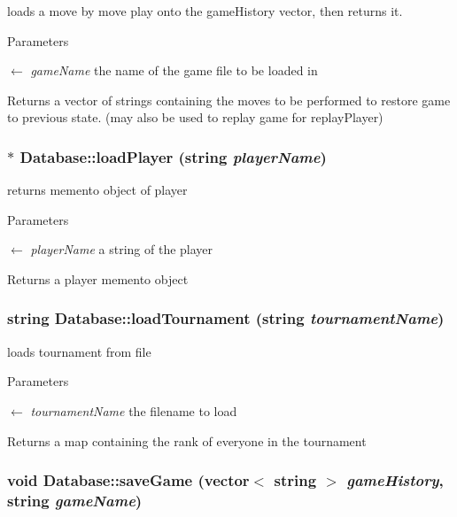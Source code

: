 loads a move by move play onto the gameHistory vector, then returns it. 
\begin{DoxyParams}{Parameters}
\item[\mbox{$\leftarrow$} {\em gameName}]the name of the game file to be loaded in \end{DoxyParams}
\begin{DoxyReturn}{Returns}
a vector of strings containing the moves to be performed to restore game to previous state. (may also be used to replay game for replayPlayer) 
\end{DoxyReturn}
\hypertarget{classDatabase_a635262537d097df45f6371966d9caefe}{
\subsubsection[{loadPlayer}]{$\ast$ Database::loadPlayer (string {\em playerName})}}
\label{classDatabase_a635262537d097df45f6371966d9caefe}


returns memento object of player 
\begin{DoxyParams}{Parameters}
\item[\mbox{$\leftarrow$} {\em playerName}]a string of the player \end{DoxyParams}
\begin{DoxyReturn}{Returns}
a player memento object 
\end{DoxyReturn}
\hypertarget{classDatabase_a1b403d4b38ea6c9d2e5d4d4b80f845db}{
\subsubsection[{loadTournament}]{\setlength{\rightskip}{0pt plus 5cm}string Database::loadTournament (string {\em tournamentName})}}
\label{classDatabase_a1b403d4b38ea6c9d2e5d4d4b80f845db}


loads tournament from file 
\begin{DoxyParams}{Parameters}
\item[\mbox{$\leftarrow$} {\em tournamentName}]the filename to load \end{DoxyParams}
\begin{DoxyReturn}{Returns}
a map containing the rank of everyone in the tournament 
\end{DoxyReturn}
\hypertarget{classDatabase_ab7769733153f13a11257401ed7b2bf23}{
\subsubsection[{saveGame}]{\setlength{\rightskip}{0pt plus 5cm}void Database::saveGame (vector$<$ string $>$ {\em gameHistory}, \/  string {\em gameName})}}
\label{classDatabase_ab7769733153f13a11257401ed7b2bf23}



